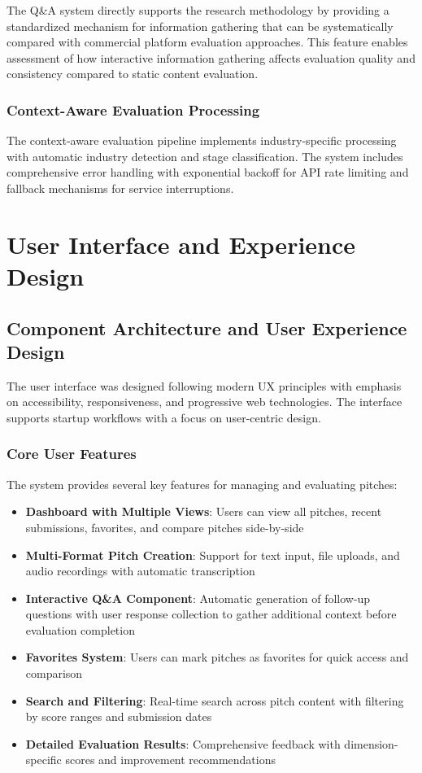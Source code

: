 The Q\&A system directly supports the research methodology by providing a standardized mechanism for information gathering that can be systematically compared with commercial platform evaluation approaches. This feature enables assessment of how interactive information gathering affects evaluation quality and consistency compared to static content evaluation.

\subsubsection{Context-Aware Evaluation Processing}
The context-aware evaluation pipeline implements industry-specific processing with automatic industry detection and stage classification. The system includes comprehensive error handling with exponential backoff for API rate limiting and fallback mechanisms for service interruptions.

\section{User Interface and Experience Design}

\subsection{Component Architecture and User Experience Design}
The user interface was designed following modern UX principles with emphasis on accessibility, responsiveness, and progressive web technologies. The interface supports startup workflows with a focus on user-centric design.

\subsubsection{Core User Features}
The system provides several key features for managing and evaluating pitches:

\begin{itemize}
  \item \textbf{Dashboard with Multiple Views}: Users can view all pitches, recent submissions, favorites, and compare pitches side-by-side
  \item \textbf{Multi-Format Pitch Creation}: Support for text input, file uploads, and audio recordings with automatic transcription
  \item \textbf{Interactive Q\&A Component}: Automatic generation of follow-up questions with user response collection to gather additional context before evaluation completion
  \item \textbf{Favorites System}: Users can mark pitches as favorites for quick access and comparison
  \item \textbf{Search and Filtering}: Real-time search across pitch content with filtering by score ranges and submission dates
  \item \textbf{Detailed Evaluation Results}: Comprehensive feedback with dimension-specific scores and improvement recommendations
\end{itemize}

